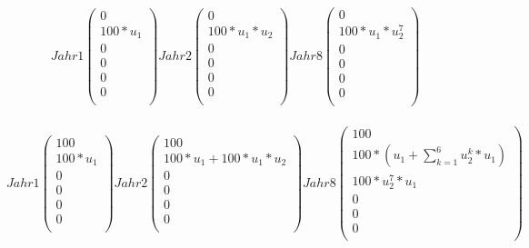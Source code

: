 \documentclass{article}
\begin{document}
\subsubsection{}
\[
Jahr 1
  \begin{pmatrix}
    0 \\
    100 * u_1 \\
    0 \\
    0 \\
    0 \\
    0 \\
  \end{pmatrix}
Jahr 2
  \begin{pmatrix}
    0 \\
    100 * u_1 * u_2 \\
    0 \\
    0 \\
    0 \\
    0 \\
  \end{pmatrix}
Jahr 8
  \begin{pmatrix}
    0 \\
    100 * u_1 * u_2^7 \\
    0 \\
    0 \\
    0 \\
    0 \\
  \end{pmatrix}
\]

\subsubsection{}
\[
Jahr 1
  \begin{pmatrix}
    100 \\
    100 * u_1 \\
    0 \\
    0 \\
    0 \\
    0 \\
  \end{pmatrix}
Jahr 2
  \begin{pmatrix}
    100 \\
    100 * u_1 + 100 * u_1 * u_2\\
    0 \\
    0 \\
    0 \\
    0 \\
  \end{pmatrix}
Jahr 8
  \begin{pmatrix}
    100 \\
    100 * (u_1 + \sum_{k=1}^{6} u_2^k * u_1) \\
    100 * u_2^7 * u_1 \\
    0 \\
    0 \\
    0 \\
  \end{pmatrix}
\]
\end{document}
